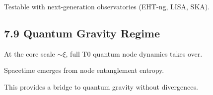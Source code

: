 \documentclass[12pt,a4paper]{article}
\begin{document}
	Testable with next-generation observatories (EHT-ng, LISA, SKA).
	
	\subsection{7.9 Quantum Gravity Regime}
	
	At the core scale $\sim \xi$, full T0 quantum node dynamics takes over.
	
	Spacetime emerges from node entanglement entropy.
	
	This provides a bridge to quantum gravity without divergences.
	
\end{document}
